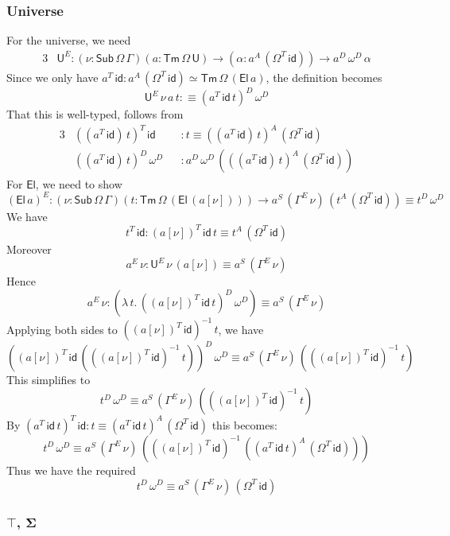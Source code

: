 \documentclass[12pt,a4paper,twoside,openany]{book}
\theoremstyle{remark}
\theoremstyle{definition}
\theoremstyle{theorem}
\newcommand{\bs}[1]{\boldsymbol{#1}}
\newcommand{\id}{\mathsf{id}}
\newcommand{\Sub}{\mathsf{Sub}}
\newcommand{\Tm}{\mathsf{Tm}}
\newcommand{\U}{\mathsf{U}}
\newcommand{\El}{\mathsf{El}}
\newcommand{\defn}{:\equiv}
\begin{document}
\subsubsection{Universe}
For the universe, we need
\begin{alignat*}{3}
  &\U^E : (\nu : \Sub\,\Omega\,\Gamma)(a : \Tm\,\Omega\,\U) \to (\alpha : a^A\,(\Omega^T\,\id)) \to a^D\,\omega^D\,\alpha
\end{alignat*}
Since we only have $a^T\,\id : a^A\,(\Omega^T\,\id) \simeq \Tm\,\Omega\,(\El\,a)$, the definition
becomes
\[
  \U^E\,\nu\,a\,t \defn (a^T\,\id\,t)^D\,\omega^D
\]
That this is well-typed, follows from
\begin{alignat*}{3}
  & ((a^T\,\id)\,t)^T\,\id &&: t \equiv ((a^T\,\id)\,t)^A\,(\Omega^T\,\id) \\
  & ((a^T\,\id)\,t)^D\,\omega^D &&: a^D\,\omega^D\,(((a^T\,\id)\,t)^A\,(\Omega^T\,\id))
\end{alignat*}
For $\El$, we need to show
\[
(\El\,a)^E : (\nu : \Sub\,\Omega\,\Gamma)(t : \Tm\,\Omega\,(\El\,(a[\nu]))) \to a^S\,(\Gamma^E\,\nu)\,(t^A\,(\Omega^T\,\id)) \equiv t^D\,\omega^D
\]
We have
\[
  t^T\,\id : (a[\nu])^T\,\id\,t \equiv t^A\,(\Omega^T\,\id)
\]
Moreover
\[
  a^E\,\nu : \U^E\,\nu\,(a[\nu]) \equiv a^S\,(\Gamma^E\,\nu)
\]
Hence
\[
  a^E\,\nu : (\lambda\,t.\,((a[\nu])^T\,\id\,t)^D\,\omega^D) \equiv a^S\,(\Gamma^E\,\nu)
\]
Applying both sides to $((a[\nu])^T\,\id)^{-1}\,t$, we have
\[
  ((a[\nu])^T\,\id\,(((a[\nu])^T\,\id)^{-1}\,t))^D\,\omega^D \equiv a^S\,(\Gamma^E\,\nu)\,(((a[\nu])^T\,\id)^{-1}\,t)
\]
This simplifies to
\[
  t^D\,\omega^D \equiv a^S\,(\Gamma^E\,\nu)\,(((a[\nu])^T\,\id)^{-1}\,t)
\]
By $(a^T\,\id\,t)^T\,\id : t \equiv (a^T\,\id\,t)^A\,(\Omega^T\,\id)$ this becomes:
\[
  t^D\,\omega^D \equiv a^S\,(\Gamma^E\,\nu)\,(((a[\nu])^T\,\id)^{-1}\,((a^T\,\id\,t)^A\,(\Omega^T\,\id)))
\]
Thus we have the required
\[
  t^D\,\omega^D \equiv a^S\,(\Gamma^E\,\nu)\,(\Omega^T\,\id)
  \]

\subsubsection{$\bs{\top}$, $\bs{\Sigma}$}
\end{document}
